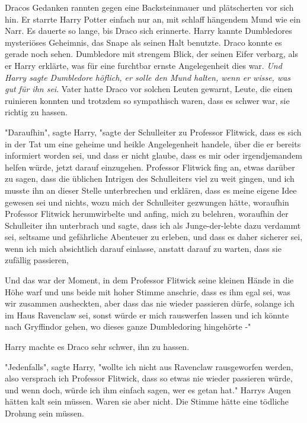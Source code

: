 {Dracos Gedanken rannten gegen eine Backsteinmauer und plätscherten vor sich hin. Er starrte Harry Potter einfach nur an, mit schlaff hängendem Mund wie ein Narr. Es dauerte so lange, bis Draco sich erinnerte. Harry kannte Dumbledores mysteriöses Geheimnis, das Snape als seinen Halt benutzte. Draco konnte es gerade noch sehen. Dumbledore mit strengem Blick, der seinen Eifer verbarg, als er Harry erklärte, was für eine furchtbar ernste Angelegenheit dies war. \emph{Und Harry sagte Dumbledore höflich, er solle den Mund halten, wenn er wisse, was gut für ihn sei}. Vater hatte Draco vor solchen Leuten gewarnt, Leute, die einen ruinieren konnten und trotzdem so sympathisch waren, dass es schwer war, sie richtig zu hassen.

"Daraufhin", sagte Harry, "sagte der Schulleiter zu Professor Flitwick, dass es sich in der Tat um eine geheime und heikle Angelegenheit handele, über die er bereits informiert worden sei, und dass er nicht glaube, dass es mir oder irgendjemandem helfen würde, jetzt darauf einzugehen. Professor Flitwick fing an, etwas darüber zu sagen, dass die üblichen Intrigen des Schulleiters viel zu weit gingen, und ich musste ihn an dieser Stelle unterbrechen und erklären, dass es meine eigene Idee gewesen sei und nichts, wozu mich der Schulleiter gezwungen hätte, woraufhin Professor Flitwick herumwirbelte und anfing, mich zu belehren, woraufhin der Schulleiter ihn unterbrach und sagte, dass ich als Junge-der-lebte dazu verdammt sei, seltsame und gefährliche Abenteuer zu erleben, und dass es daher sicherer sei, wenn ich mich absichtlich darauf einlasse, anstatt darauf zu warten, dass sie zufällig passieren,

Und das war der Moment, in dem Professor Flitwick seine kleinen Hände in die Höhe warf und uns beide mit hoher Stimme anschrie, dass es ihm egal sei, was wir zusammen ausheckten, aber dass das nie wieder passieren dürfe, solange ich im Haus Ravenclaw sei, sonst würde er mich rauswerfen lassen und ich könnte nach Gryffindor gehen, wo dieses ganze Dumbledoring hingehörte -"

Harry machte es Draco sehr schwer, ihn zu hassen.

"Jedenfalls", sagte Harry, "wollte ich nicht aus Ravenclaw rausgeworfen werden, also versprach ich Professor Flitwick, dass so etwas nie wieder passieren würde, und wenn doch, würde ich ihm einfach sagen, wer es getan hat." Harrys Augen hätten kalt sein müssen. Waren sie aber nicht. Die Stimme hätte eine tödliche Drohung sein müssen.

}
